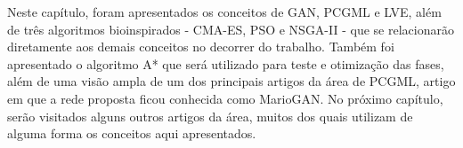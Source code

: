Neste capítulo, foram apresentados os conceitos de GAN, PCGML e LVE, além de três algoritmos bioinspirados - CMA-ES, PSO e NSGA-II - que se relacionarão diretamente aos demais conceitos no decorrer do trabalho. Também foi apresentado o algoritmo A* que será utilizado para teste e otimização das fases, além de uma visão ampla de um dos principais artigos da área de PCGML, artigo em que a rede proposta ficou conhecida como MarioGAN. No próximo capítulo, serão visitados alguns outros artigos da área, muitos dos quais utilizam de alguma forma os conceitos aqui apresentados.












